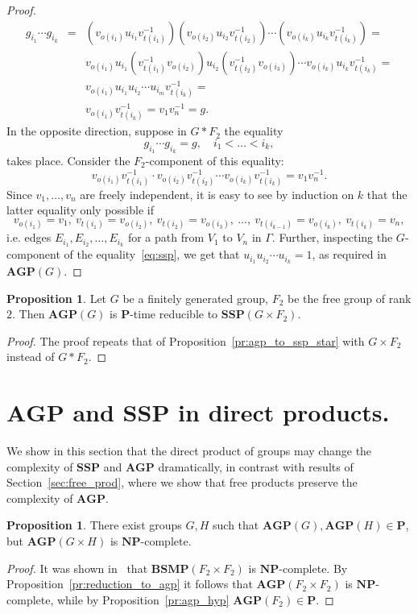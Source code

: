 \documentclass[10pt]{amsart}
\theoremstyle{definition}
\newtheorem{proposition}[theorem]{Proposition}
\def\P{{\mathbf{P}}}
\def\NP{{\mathbf{NP}}}
\def\SSP{{\mathbf{SSP}}}
\def\BSMP{{\mathbf{BSMP}}}
\def\AGP{{\mathbf{AGP}}}
\begin{document}
\begin{proof}
\begin{eqnarray*}
g_{i_1}\cdots g_{i_k}&=&(v_{o(i_1)}u_{i_1}v_{t(i_1)}^{-1})
(v_{o(i_2)}u_{i_2}v_{t(i_2)}^{-1})\cdots (v_{o(i_k)}u_{i_k}v_{t(i_k)}^{-1})=\\
&&v_{o(i_1)}u_{i_1}(v_{t(i_1)}^{-1}
v_{o(i_2)})u_{i_2}(v_{t(i_2)}^{-1}v_{o(i_3)})\cdots v_{o(i_k)}u_{i_k}v_{t(i_k)}^{-1}=\\
&&v_{o(i_1)}u_{i_1}u_{i_2}\cdots u_{i_m}v_{t(i_k)}^{-1}=\\
&&v_{o(i_1)}v_{t(i_k)}^{-1}=v_{1}v_{n}^{-1}=g.
\end{eqnarray*}
In the opposite direction, suppose in $G\ast F_2$ the equality
\begin{equation}\label{eq:ssp}
g_{i_1}\cdots g_{i_k}=g,\quad i_1<\ldots<i_k,
\end{equation}
takes place. Consider the $F_2$-component of this equality:
$$
v_{o(i_1)}v_{t(i_1)}^{-1}\cdot v_{o(i_2)}v_{t(i_2)}^{-1}\cdots v_{o(i_k)}v_{t(i_k)}^{-1}=v_1v_n^{-1}.
$$
Since $v_1,\ldots, v_n$ are freely independent, it is easy to see by induction on $k$ that the latter equality only possible if
$$
v_{o(i_1)}=v_1,\ v_{t(i_1)}=v_{o(i_2)},\ v_{t(i_2)}=v_{o(i_3)},\ \ldots,\ v_{t(i_{k-1})}=v_{o(i_k)},\ v_{t(i_k)}=v_n,
$$
i.e. edges $E_{i_1}, E_{i_2},\ldots, E_{i_k}$ for a path from $V_1$ to $V_n$ in $\Gamma$. Further, inspecting the $G$-component of the equality~\eqref{eq:ssp}, we get that $u_{i_1}u_{i_2}\cdots u_{i_k}=1$, as required in $\AGP(G)$.
\end{proof}

\begin{proposition}\label{pr:agp_to_ssp_cross}
Let $G$ be a finitely generated group, $F_2$ be the free group of rank $2$. Then $\AGP(G)$ is $\P$-time reducible to $\SSP(G\times F_2)$.
\end{proposition}
\begin{proof}
The proof repeats that of Proposition~\ref{pr:agp_to_ssp_star} with $G\times F_2$ instead of $G\ast F_2$.
\end{proof}

\section{$\AGP$ and $\SSP$ in direct products.}\label{sec:direct_prod}
We show in this section that the direct product of groups may change the complexity of $\SSP$ and $\AGP$ dramatically, in contrast with results of Section~\ref{sec:free_prod}, where we show that free products preserve the complexity of $\AGP$.
\begin{proposition}\label{pr:agp_cross}
There exist groups $G,H$ such that $\AGP(G),\AGP(H)\in\P$, but $\AGP(G\times H)$ is $\NP$-complete.
\end{proposition}
\begin{proof}
It was shown in~\cite[Theorem 7.4]{Miasnikov-Nikolaev-Ushakov:2014a} that $\BSMP(F_2\times F_2)$ is $\NP$-complete. By Proposition~\ref{pr:reduction_to_agp} it follows that $\AGP(F_2\times F_2)$ is $\NP$-complete, while by Proposition~\ref{pr:agp_hyp} $\AGP(F_2)\in\P$.
\end{proof}
\end{document}
